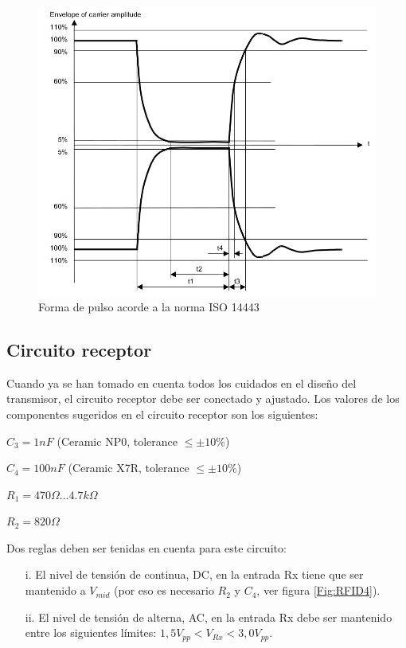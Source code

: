 \begin{figure}[H]
\centering
  \begin{center}
  \includegraphics[scale=.4]{Imagenes/anexo1.png} 
  \end{center}
  \caption{Forma de pulso acorde a la norma ISO 14443}\label{Fig:pulso14443} 
\end{figure}


\subsection{Circuito receptor}

Cuando ya se han tomado en cuenta todos los cuidados en el diseño del transmisor, el circuito receptor debe ser conectado y ajustado.
Los valores de los componentes sugeridos en el circuito receptor son los siguientes:

\bigskip
	$C_{3} = 1nF$ 			(Ceramic NP0, tolerance $\leq \pm 10\%$) 
	
	$C_{4} = 100nF$ 			(Ceramic X7R, tolerance $\leq \pm 10\%$) 
	
	$R_{1} = 470 \Omega {...} 4.7 k \Omega $ 
	
	$R_{2} = 820 \Omega $
	
\bigskip
Dos reglas deben ser tenidas en cuenta para este circuito:

\begin{itemize}
\item[i.] El nivel de tensión de continua, DC, en la entrada Rx tiene que ser mantenido a $V_{mid}$ (por eso es necesario $R_{2}$ y $C_{4}$, ver figura \ref{Fig:RFID4}).
\item[ii.] El nivel de tensión de alterna, AC, en la entrada Rx debe ser mantenido entre los siguientes límites: $1,5V_{pp} < V_{Rx} < 3,0V_{pp}$.
\end{itemize}	

